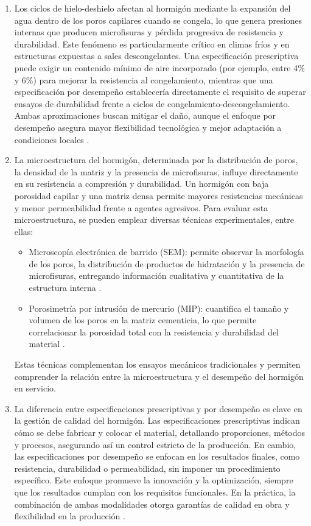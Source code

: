 \begin{enumerate}
    \item Los ciclos de hielo-deshielo afectan al hormigón mediante la expansión del agua dentro de los poros capilares cuando se congela, lo que genera presiones internas que producen microfisuras y pérdida progresiva de resistencia y durabilidad. Este fenómeno es particularmente crítico en climas fríos y en estructuras expuestas a sales descongelantes. Una especificación prescriptiva puede exigir un contenido mínimo de aire incorporado (por ejemplo, entre 4\% y 6\%) para mejorar la resistencia al congelamiento, mientras que una especificación por desempeño establecería directamente el requisito de superar ensayos de durabilidad frente a ciclos de congelamiento-descongelamiento. Ambas aproximaciones buscan mitigar el daño, aunque el enfoque por desempeño asegura mayor flexibilidad tecnológica y mejor adaptación a condiciones locales \citep{Powers1954,MehtaMonteiro2014}.

    \item La microestructura del hormigón, determinada por la distribución de poros, la densidad de la matriz y la presencia de microfisuras, influye directamente en su resistencia a compresión y durabilidad. Un hormigón con baja porosidad capilar y una matriz densa permite mayores resistencias mecánicas y menor permeabilidad frente a agentes agresivos. Para evaluar esta microestructura, se pueden emplear diversas técnicas experimentales, entre ellas:  
    \begin{itemize}
        \item Microscopía electrónica de barrido (SEM): permite observar la morfología de los poros, la distribución de productos de hidratación y la presencia de microfisuras, entregando información cualitativa y cuantitativa de la estructura interna \citep{Diamond1999}.  
        \item Porosimetría por intrusión de mercurio (MIP): cuantifica el tamaño y volumen de los poros en la matriz cementicia, lo que permite correlacionar la porosidad total con la resistencia y durabilidad del material \citep{Gallucci2012}.  
    \end{itemize}
    Estas técnicas complementan los ensayos mecánicos tradicionales y permiten comprender la relación entre la microestructura y el desempeño del hormigón en servicio.

    \item La diferencia entre especificaciones prescriptivas y por desempeño es clave en la gestión de calidad del hormigón. Las especificaciones prescriptivas indican cómo se debe fabricar y colocar el material, detallando proporciones, métodos y procesos, asegurando así un control estricto de la producción. En cambio, las especificaciones por desempeño se enfocan en los resultados finales, como resistencia, durabilidad o permeabilidad, sin imponer un procedimiento específico. Este enfoque promueve la innovación y la optimización, siempre que los resultados cumplan con los requisitos funcionales. En la práctica, la combinación de ambas modalidades otorga garantías de calidad en obra y flexibilidad en la producción \citep{NCh170-2016}.


\end{enumerate}
